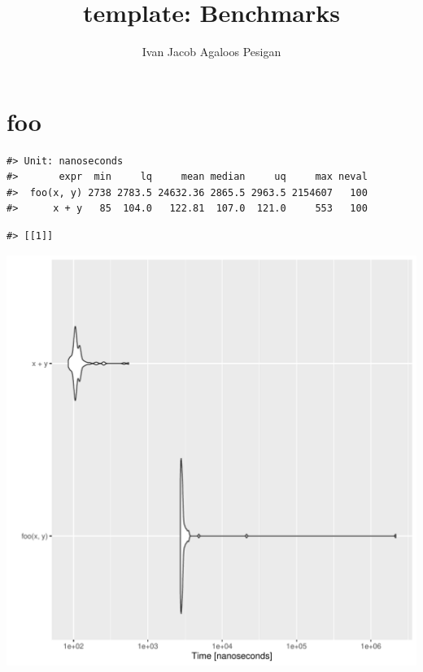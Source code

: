 \documentclass{article}\usepackage[]{graphicx}\usepackage{xcolor}
\title{template: Benchmarks}
\author{Ivan Jacob Agaloos Pesigan}
\date{}
\makeatletter
\newenvironment{kframe}{%
 \def\at@end@of@kframe{}%
 \ifinner\ifhmode%
  \def\at@end@of@kframe{\end{minipage}}%
  \begin{minipage}{\columnwidth}%
 \fi\fi%
 \def\FrameCommand##1{\hskip\@totalleftmargin \hskip-\fboxsep
 \colorbox{shadecolor}{##1}\hskip-\fboxsep
     \hskip-\linewidth \hskip-\@totalleftmargin \hskip\columnwidth}%
 \MakeFramed {\advance\hsize-\width
   \@totalleftmargin\z@ \linewidth\hsize
   \@setminipage}}%
 {\par\unskip\endMakeFramed%
 \at@end@of@kframe}
\newenvironment{knitrout}{}{} %
\makeatother
\begin{document}
\maketitle







\section{foo}



\begin{knitrout}
\color{fgcolor}\begin{kframe}
\begin{verbatim}
#> Unit: nanoseconds
#>       expr  min     lq     mean median     uq     max neval
#>  foo(x, y) 2738 2783.5 24632.36 2865.5 2963.5 2154607   100
#>      x + y   85  104.0   122.81  107.0  121.0     553   100
\end{verbatim}


{\ttfamily\noindent\itshape\color{messagecolor}{\#> Coordinate system already present. Adding new coordinate system, which will replace the existing one.}}\begin{verbatim}
#> [[1]]
\end{verbatim}
\end{kframe}
\includegraphics[width=1\linewidth]{man/figures/latex-test-benchmark-template-foo-1} 

\end{knitrout}
\end{document}
